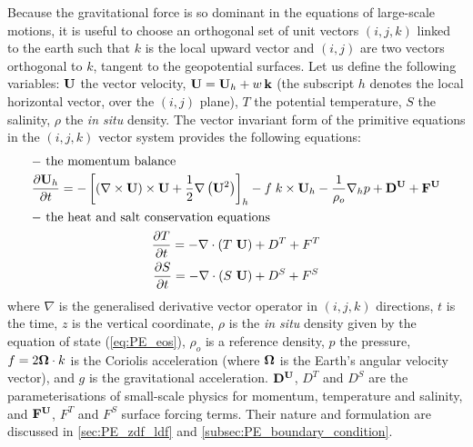 \documentclass[../main/NEMO_manual]{subfiles}
\begin{document}
Because the gravitational force is so dominant in the equations of large-scale motions,
it is useful to choose an orthogonal set of unit vectors $(i,j,k)$ linked to the earth such that
$k$ is the local upward vector and $(i,j)$ are two vectors orthogonal to $k$,
\ie tangent to the geopotential surfaces.
Let us define the following variables: $\mathbf{U}$ the vector velocity, $\mathbf{U} = \mathbf{U}_h + w \, \mathbf{k}$
(the subscript $h$ denotes the local horizontal vector, \ie over the $(i,j)$ plane), 
$T$ the potential temperature, $S$ the salinity, $\rho$ the \textit{in situ} density.
The vector invariant form of the primitive equations in the $(i,j,k)$ vector system provides
the following equations:
\begin{subequations}
  \label{eq:PE}
  \begin{gather}
    \intertext{$-$ the momentum balance}
    \label{eq:PE_dyn}
    \pd[\vect U_h]{t} = - \lt[ (\nabla \times \vect U) \times \vect U + \frac{1}{2} \nabla \lt( \vect U^2 \rt) \rt]_h
                        - f \; k \times \vect U_h - \frac{1}{\rho_o} \nabla_h p
                        + \vect D^{\vect U} + \vect F^{\vect U} \\
    \intertext{$-$ the heat and salt conservation equations}
    \label{eq:PE_tra_T}
    \pd[T]{t} = - \nabla \cdot (T \ \vect U) + D^T + F^T \\
    \label{eq:PE_tra_S}
    \pd[S]{t} = - \nabla \cdot (S \ \vect U) + D^S + F^S
  \end{gather}
\end{subequations}
where $\nabla$ is the generalised derivative vector operator in $(i,j,k)$ directions, $t$ is the time,
$z$ is the vertical coordinate, $\rho$ is the \textit{in situ} density given by the equation of state
(\autoref{eq:PE_eos}), $\rho_o$ is a reference density, $p$ the pressure,
$f = 2 \mathbf{\Omega} \cdot k$ is the Coriolis acceleration
(where $\mathbf{\Omega}$ is the Earth's angular velocity vector), and $g$ is the gravitational acceleration.
$\mathbf{D}^{\mathbf{U}}$, $D^T$ and $D^S$ are the parameterisations of small-scale physics for momentum,
temperature and salinity, and $\mathbf{F}^{\mathbf{U}}$, $F^T$ and $F^S$ surface forcing terms.
Their nature and formulation are discussed in \autoref{sec:PE_zdf_ldf} and \autoref{subsec:PE_boundary_condition}.

\end{document}
